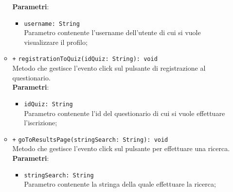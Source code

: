 \begin{itemize}
\begin{itemize}
		\textbf{Parametri}:
		\begin{itemize}
			\item \texttt{username: String} \\
			Parametro contenente l'username dell'utente di cui si vuole visualizzare il profilo;
		\end{itemize} 
		\item \texttt{+} \texttt{registrationToQuiz(idQuiz: String): void} \\
		Metodo che gestisce l’evento click sul pulsante di registrazione al questionario.\\
		\textbf{Parametri}:
		\begin{itemize}
			\item \texttt{idQuiz: String} \\
			Parametro contenente l'id del questionario di cui si vuole effettuare l'iscrizione;
		\end{itemize} 
		\item \texttt{+} \texttt{goToResultsPage(stringSearch: String): void} \\
		Metodo che gestisce l’evento click sul pulsante per effettuare una ricerca.\\
		\textbf{Parametri}:
		\begin{itemize}
			\item \texttt{stringSearch: String} \\
			Parametro contenente la stringa della quale effettuare la ricerca;
		\end{itemize} 
	\end{itemize}
\end{itemize}

